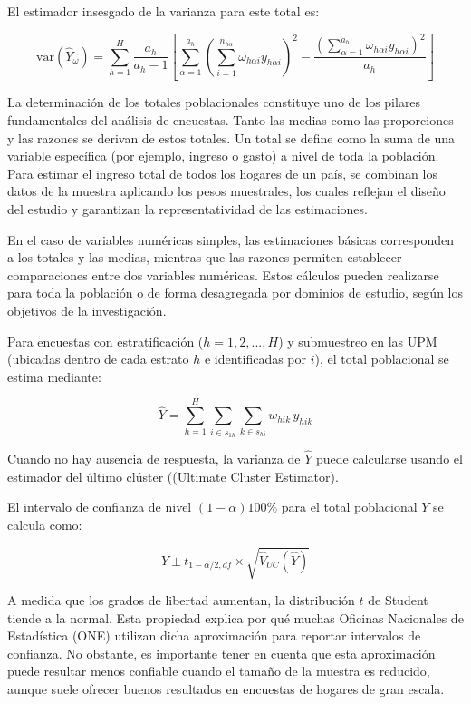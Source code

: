 \documentclass[
  spanish,
  12pt,
]{book}
\begin{document}
El estimador insesgado de la varianza para este total es:

\[
\text{var}\left(\hat{Y}_{\omega}\right) = \sum_{h=1}^{H} \frac{a_h}{a_h - 1} \left[ \sum_{\alpha=1}^{a_h} \left( \sum_{i=1}^{n_{h\alpha}} \omega_{h\alpha i} y_{h\alpha i} \right)^2 - \frac{\left( \sum_{\alpha=1}^{a_h} \omega_{h\alpha i} y_{h\alpha i} \right)^2}{a_h} \right]
\]

La determinación de los totales poblacionales constituye uno de los pilares fundamentales del análisis de encuestas. Tanto las medias como las proporciones y las razones se derivan de estos totales. Un total se define como la suma de una variable específica (por ejemplo, ingreso o gasto) a nivel de toda la población. Para estimar el ingreso total de todos los hogares de un país, se combinan los datos de la muestra aplicando los pesos muestrales, los cuales reflejan el diseño del estudio y garantizan la representatividad de las estimaciones.

En el caso de variables numéricas simples, las estimaciones básicas corresponden a los totales y las medias, mientras que las razones permiten establecer comparaciones entre dos variables numéricas. Estos cálculos pueden realizarse para toda la población o de forma desagregada por dominios de estudio, según los objetivos de la investigación.

Para encuestas con estratificación (\(h=1,2,...,H\)) y submuestreo en las UPM (ubicadas dentro de cada estrato \(h\) e identificadas por \(i\)), el total poblacional se estima mediante:

\[
\hat{Y} = \sum_{h=1}^{H} \sum_{i \in s_{1h}} \sum_{k \in s_{hi}} w_{hik} \, y_{hik}
\]

Cuando no hay ausencia de respuesta, la varianza de \(\hat{Y}\) puede calcularse usando el estimador del último clúster ((Ultimate Cluster Estimator).

El intervalo de confianza de nivel \((1-\alpha)100\%\) para el total poblacional \(Y\) se calcula como:

\[
\hat{Y} \pm t_{1-\alpha/2, df} \times \sqrt{\hat{V}_{UC}(\hat{Y})}
\]

A medida que los grados de libertad aumentan, la distribución \(t\) de Student tiende a la normal. Esta propiedad explica por qué muchas Oficinas Nacionales de Estadística (ONE) utilizan dicha aproximación para reportar intervalos de confianza. No obstante, es importante tener en cuenta que esta aproximación puede resultar menos confiable cuando el tamaño de la muestra es reducido, aunque suele ofrecer buenos resultados en encuestas de hogares de gran escala.
\end{document}
